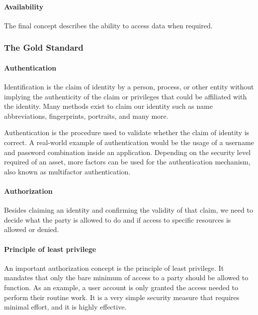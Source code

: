 \paragraph{Availability}
The final concept describes the ability to access data when required.

\subsubsection{The Gold Standard}

\paragraph{Authentication}
Identification is the claim of identity by a person, process, or other entity without implying the authenticity of the claim or privileges that could be affiliated with the identity. Many methods exist to claim our identity such as name abbreviations, fingerprints, portraits, and many more.

Authentication is the procedure used to validate whether the claim of identity is correct. A real-world example of authentication would be the usage of a username and password combination inside an application. Depending on the security level required of an asset, more factors can be used for the authentication mechanism, also known as multifactor authentication.

\paragraph{Authorization}
Besides claiming an identity and confirming the validity of that claim, we need to decide what the party is allowed to do and if access to specific resources is allowed or denied. 

\paragraph{Principle of least privilege}
An important authorization concept is the principle of least privilege. It mandates that only the bare minimum of access to a party should be allowed to function. As an example, a user account is only granted the access needed to perform their routine work. It is a very simple security measure that requires minimal effort, and it is highly effective.

